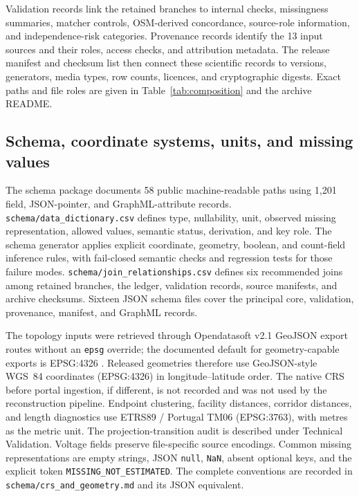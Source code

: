 \documentclass[10pt]{article}
\newcommand{\code}[1]{\texttt{#1}}
\begin{document}
Validation records link the retained branches to internal checks, missingness summaries, matcher controls, OSM-derived concordance, source-role information, and independence-risk categories. Provenance records identify the 13 input sources and their roles, access checks, and attribution metadata. The release manifest and checksum list then connect these scientific records to versions, generators, media types, row counts, licences, and cryptographic digests. Exact paths and file roles are given in Table~\ref{tab:composition} and the archive README.

\subsection{Schema, coordinate systems, units, and missing values}

The schema package documents 58 public machine-readable paths using 1,201 field, JSON-pointer, and GraphML-attribute records. \code{schema/data\_dictionary.csv} defines type, nullability, unit, observed missing representation, allowed values, semantic status, derivation, and key role. The schema generator applies explicit coordinate, geometry, boolean, and count-field inference rules, with fail-closed semantic checks and regression tests for those failure modes. \code{schema/join\_relationships.csv} defines six recommended joins among retained branches, the ledger, validation records, source manifests, and archive checksums. Sixteen JSON schema files cover the principal core, validation, provenance, manifest, and GraphML records.

The topology inputs were retrieved through Opendatasoft v2.1 GeoJSON export routes without an \code{epsg} override; the documented default for geometry-capable exports is EPSG:4326 \cite{OpendatasoftExploreAPI2026}. Released geometries therefore use GeoJSON-style WGS~84 coordinates (EPSG:4326) in longitude--latitude order. The native CRS before portal ingestion, if different, is not recorded and was not used by the reconstruction pipeline. Endpoint clustering, facility distances, corridor distances, and length diagnostics use ETRS89 / Portugal TM06 (EPSG:3763), with metres as the metric unit. The projection-transition audit is described under Technical Validation. Voltage fields preserve file-specific source encodings. Common missing representations are empty strings, JSON \code{null}, \code{NaN}, absent optional keys, and the explicit token \code{MISSING\_NOT\_ESTIMATED}. The complete conventions are recorded in \code{schema/crs\_and\_geometry.md} and its JSON equivalent.
\end{document}
